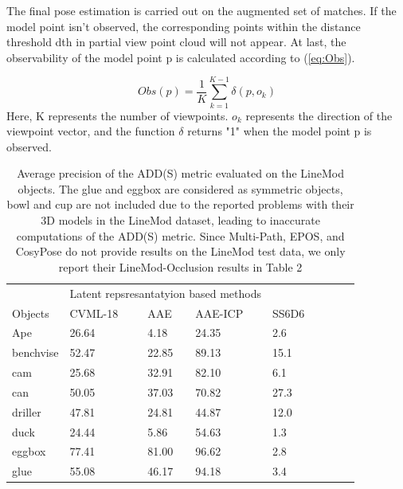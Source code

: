 \documentclass[9pt,a4paper,twoside]{tau}
\begin{document}
The final pose estimation is carried out on the augmented set of matches.
If the model point isn’t observed, the corresponding points within the distance threshold dth in partial view point cloud will not appear. At last, the observability of the model point p is calculated according to (\ref{eq:Obs}).

    \begin{equation} \label{eq:Obs}
        Obs(p) =\frac{1}{K} \sum_{k=1}^{K-1} \delta(p, o_k)
    \end{equation}
Here, K represents the number of viewpoints. $o_k$ represents the direction of the viewpoint vector, and the function  $\delta$ returns "1" when the model point p is observed.
            
    \begin{table}[H]
        \centering
        \caption{Average precision of the ADD(S) metric evaluated on the LineMod objects. The glue and eggbox are considered as symmetric objects, bowl and cup are not included due to the reported problems with their 3D models in the LineMod dataset, leading to inaccurate computations of the ADD(S) metric. Since Multi-Path, EPOS, and CosyPose do not provide results on the LineMod test data, we only report their LineMod-Occlusion results in Table 2}
    \label{tab:table}
        \begin{tabular}{lllllllll}
            & \multicolumn{3}{l}{Latent repsresantatyion based methods}\\
Objects     & CVML-18            & AAE              & AAE-ICP           & SS6D6         \\
Ape         & 26.64              & 4.18             & 24.35             & 2.6           \\
benchvise   & 52.47              & 22.85            & 89.13             & 15.1          \\
cam         & 25.68              & 32.91            & 82.10             & 6.1           \\
can         & 50.05              & 37.03            & 70.82             & 27.3          \\
driller     & 47.81              & 24.81            & 44.87             & 12.0          \\
duck        & 24.44              & 5.86             & 54.63             & 1.3           \\
eggbox      & 77.41              & 81.00            & 96.62             & 2.8           \\
glue        & 55.08              & 46.17            & 94.18             & 3.4           \\

\end{tabular}
\end{table}
\end{document}
